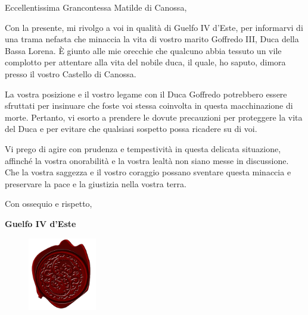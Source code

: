 \documentclass[a4,openany,nodeprecatedcode]{dndbook}
\begin{document}
\vspace*{3cm}
\Fontlukas\Large
Eccellentissima Grancontessa Matilde di Canossa,

Con la presente, mi rivolgo a voi in qualità di Guelfo IV d'Este, per informarvi di una trama nefasta che minaccia la vita di vostro marito Goffredo III, Duca della Bassa Lorena. È giunto alle mie orecchie che qualcuno abbia tessuto un vile complotto per attentare alla vita del nobile duca, il quale, ho saputo, dimora presso il vostro Castello di Canossa.

La vostra posizione e il vostro legame con il Duca Goffredo potrebbero essere sfruttati per insinuare che foste voi stessa coinvolta in questa macchinazione di morte. Pertanto, vi esorto a prendere le dovute precauzioni per proteggere la vita del Duca e per evitare che qualsiasi sospetto possa ricadere su di voi.

Vi prego di agire con prudenza e tempestività in questa delicata situazione, affinché la vostra onorabilità e la vostra lealtà non siano messe in discussione. Che la vostra saggezza e il vostro coraggio possano sventare questa minaccia e preservare la pace e la giustizia nella vostra terra.

Con ossequio e rispetto,

\hspace*{9cm}\Huge\textbf{Guelfo IV d'Este}

\begin{figure}
\includegraphics[width=3cm]{img/sigillo.png}
\end{figure}
\end{document}
